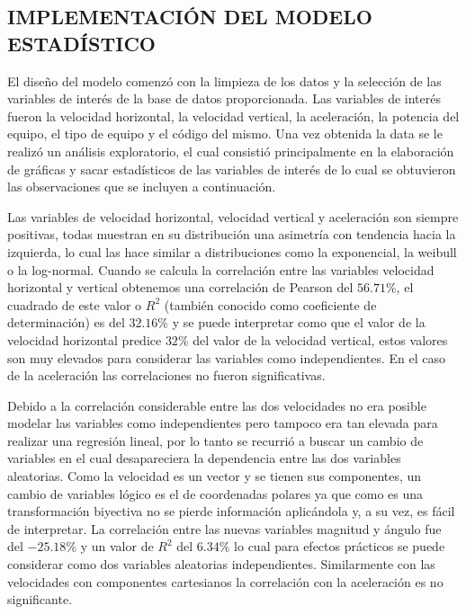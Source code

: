 \subsection{IMPLEMENTACIÓN DEL MODELO ESTADÍSTICO}

El diseño del modelo comenzó con la limpieza de los datos y la selección de las
variables de interés de la base de datos proporcionada. Las variables de
interés fueron la velocidad horizontal, la velocidad vertical, la aceleración,
la potencia del equipo, el tipo de equipo y el código del mismo. Una vez
obtenida la data se le realizó un análisis exploratorio, el cual
consistió principalmente en la elaboración de gráficas y sacar estadísticos de
las variables de interés de lo cual se obtuvieron las observaciones que se incluyen
a continuación.

Las variables de velocidad horizontal, velocidad vertical y aceleración son
siempre positivas, todas muestran en su distribución una asimetría con
tendencia hacia la izquierda, lo cual las hace similar a distribuciones como la
exponencial, la weibull o la log-normal. Cuando se calcula la correlación entre
las variables velocidad horizontal y vertical obtenemos una
correlación de Pearson del $56.71\%$, el cuadrado de este valor o $R^2$ (también
conocido como coeficiente de determinación) es del $32.16\%$ y se puede
interpretar como que el valor de la velocidad horizontal predice $32\%$ del valor
de la velocidad vertical, estos valores son muy elevados para considerar las
variables como independientes. En el caso de la aceleración las correlaciones
no fueron significativas.

Debido a la correlación considerable entre las dos velocidades no era posible
modelar las variables como independientes pero tampoco era tan elevada para
realizar una regresión lineal, por lo tanto se recurrió a buscar un cambio de
variables en el cual desapareciera la dependencia entre las dos variables
aleatorias. Como la velocidad es un vector y se tienen sus componentes,
un cambio de variables lógico es el de coordenadas polares ya que como es
una transformación biyectiva no se pierde información aplicándola y, a
su vez, es fácil de interpretar. La correlación entre las nuevas variables
magnitud y ángulo fue del $-25.18\%$ y un valor de $R^2$ del $6.34\%$ lo cual para
efectos prácticos se puede considerar como dos variables aleatorias
independientes. Similarmente con las velocidades con componentes cartesianos la
correlación con la aceleración es no significante.

